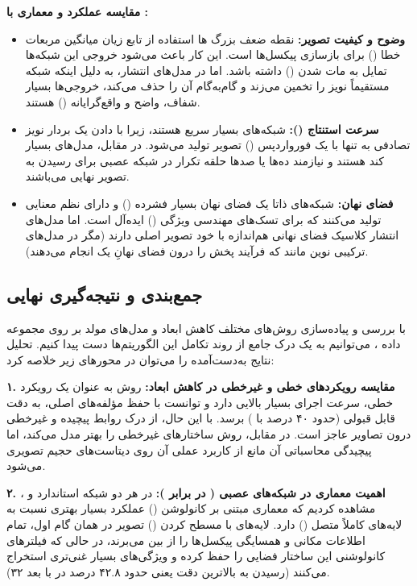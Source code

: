 \documentclass{article}
\begin{document}
\textbf{مقایسه عملکرد و معماری با :}
\begin{itemize}[label=$\bullet$]
	\item \textbf{وضوح و کیفیت تصویر:} نقطه ضعف بزرگ ها استفاده از تابع زیان میانگین مربعات خطا () برای بازسازی پیکسل‌ها است. این کار باعث می‌شود خروجی این شبکه‌ها تمایل به مات شدن () داشته باشد. اما در مدل‌های انتشار، به دلیل اینکه شبکه مستقیماً نویز را تخمین می‌زند و گام‌به‌گام آن را حذف می‌کند، خروجی‌ها بسیار شفاف، واضح و واقع‌گرایانه () هستند.
	\item \textbf{سرعت استنتاج ():} شبکه‌های  بسیار سریع هستند، زیرا با دادن یک بردار نویز تصادفی به  تنها با یک فورواردپس () تصویر تولید می‌شود. در مقابل، مدل‌های  بسیار کند هستند و نیازمند ده‌ها یا صدها حلقه تکرار در شبکه عصبی برای رسیدن به تصویر نهایی می‌باشند.
	\item \textbf{فضای نهان:} شبکه‌های  ذاتا یک فضای نهان بسیار فشرده () و دارای نظم معنایی تولید می‌کنند که برای تسک‌های مهندسی ویژگی () ایده‌آل است. اما مدل‌های انتشار کلاسیک فضای نهانی هم‌اندازه با خود تصویر اصلی دارند (مگر در مدل‌های ترکیبی نوین مانند  که فرآیند پخش را درون فضای نهانِ یک  انجام می‌دهند).
\end{itemize}
\subsection{جمع‌بندی و نتیجه‌گیری نهایی}

با بررسی و پیاده‌سازی روش‌های مختلف کاهش ابعاد و مدل‌های مولد بر روی مجموعه داده ، می‌توانیم به یک درک جامع از روند تکامل این الگوریتم‌ها دست پیدا کنیم. تحلیل نتایج به‌دست‌آمده را می‌توان در محورهای زیر خلاصه کرد:

\textbf{۱. مقایسه رویکردهای خطی و غیرخطی در کاهش ابعاد:} 
روش  به عنوان یک رویکرد خطی، سرعت اجرای بسیار بالایی دارد و توانست با حفظ مؤلفه‌های اصلی، به دقت قابل قبولی (حدود ۴۰ درصد با ) برسد. با این حال،  از درک روابط پیچیده و غیرخطی درون تصاویر عاجز است. در مقابل، روش  ساختارهای غیرخطی را بهتر مدل می‌کند، اما پیچیدگی محاسباتی آن مانع از کاربرد عملی آن روی دیتاست‌های حجیم تصویری می‌شود.

\textbf{۲. اهمیت معماری در شبکه‌های عصبی ( در برابر ):}
در هر دو شبکه  استاندارد و ، مشاهده کردیم که معماری مبتنی بر کانولوشن () عملکرد بسیار بهتری نسبت به لایه‌های کاملاً متصل () دارد. لایه‌های  با مسطح کردن () تصویر در همان گام اول، تمام اطلاعات مکانی و همسایگی پیکسل‌ها را از بین می‌برند، در حالی که فیلترهای کانولوشنی این ساختار فضایی را حفظ کرده و ویژگی‌های بسیار غنی‌تری استخراج می‌کنند (رسیدن به بالاترین دقت یعنی حدود ۴۲.۸ درصد در  با بعد ۳۲).
\end{document}
